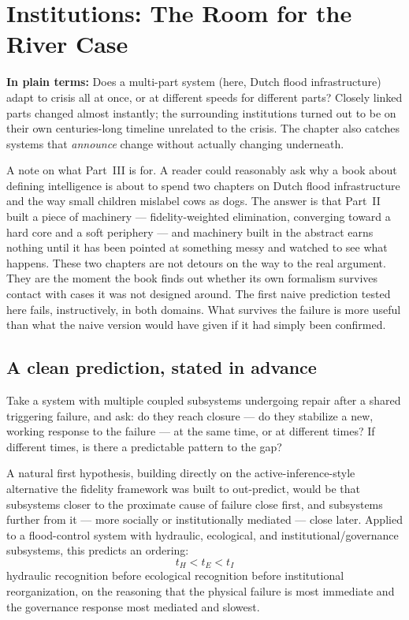 \chapter{Institutions: The Room for the River Case}
\label{ch:room-for-river}

\begin{plainlanguage}
\textbf{In plain terms:} Does a multi-part system (here, Dutch flood infrastructure) adapt to crisis all at once, or at different speeds for different parts? Closely linked parts changed almost instantly; the surrounding institutions turned out to be on their own centuries-long timeline unrelated to the crisis. The chapter also catches systems that \emph{announce} change without actually changing underneath.
\end{plainlanguage}

\begin{chapternote}
A note on what Part~III is for. A reader could reasonably ask why a book about defining intelligence is about to spend two chapters on Dutch flood infrastructure and the way small children mislabel cows as dogs. The answer is that Part~II built a piece of machinery --- fidelity-weighted elimination, converging toward a hard core and a soft periphery --- and machinery built in the abstract earns nothing until it has been pointed at something messy and watched to see what happens. These two chapters are not detours on the way to the real argument. They are the moment the book finds out whether its own formalism survives contact with cases it was not designed around. The first naive prediction tested here fails, instructively, in both domains. What survives the failure is more useful than what the naive version would have given if it had simply been confirmed.
\end{chapternote}

\section{A clean prediction, stated in advance}

Take a system with multiple coupled subsystems undergoing repair after a shared triggering failure, and ask: do they reach closure --- do they stabilize a new, working response to the failure --- at the same time, or at different times? If different times, is there a predictable pattern to the gap?

A natural first hypothesis, building directly on the active-inference-style alternative the fidelity framework was built to out-predict, would be that subsystems closer to the proximate cause of failure close first, and subsystems further from it --- more socially or institutionally mediated --- close later. Applied to a flood-control system with hydraulic, ecological, and institutional/governance subsystems, this predicts an ordering:
\[
t_H < t_E < t_I
\]
hydraulic recognition before ecological recognition before institutional reorganization, on the reasoning that the physical failure is most immediate and the governance response most mediated and slowest.

